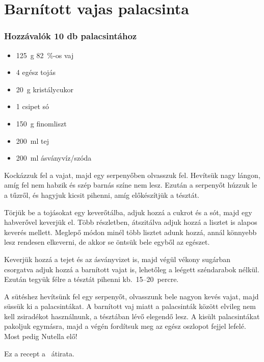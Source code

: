 \newpage
\section{Barnított vajas palacsinta} \label{sec:barnitott-vajas-palacsinta}

\subsubsection*{Hozzávalók 10 db palacsintához}
\begin{itemize}
    \item \qty{125}{\g} \qty{82}{\percent}-os vaj
    \item \num{4} egész tojás
    \item \qty{20}{\g} kristálycukor
    \item \num{1} csipet só
    \item \qty{150}{\g} finomliszt
    \item \qty{200}{\ml} tej
    \item \qty{200}{\ml} ásványvíz/szóda
\end{itemize}

Kockázzuk fel a vajat, majd egy serpenyőben olvasszuk fel. Hevítsük nagy lángon, amíg fel nem habzik és szép barnás színe nem lesz. Ezután a serpenyőt húzzuk le a tűzről, és hagyjuk kicsit pihenni, amíg előkészítjük a tésztát.

Törjük be a tojásokat egy keverőtálba, adjuk hozzá a cukrot és a sót, majd egy habverővel keverjük el. Több részletben, átszitálva adjuk hozzá a lisztet is alapos keverés mellett. Meglepő módon minél több lisztet adunk hozzá, annál könnyebb lesz rendesen elkeverni, de akkor se öntsük bele egyből az egészet.

Keverjük hozzá a tejet és az ásványvizet is, majd végül vékony sugárban csorgatva adjuk hozzá a barnított vajat is, lehetőleg a leégett széndarabok nélkül. Ezután tegyük félre a tésztát pihenni kb.~\numrange{15}{20}~percre.

A sütéshez hevítsünk fel egy serpenyőt, olvasszunk bele nagyon kevés vajat, majd süssük ki a palacsintákat. A barnított vaj miatt a palacsinták között elvileg nem kell zsiradékot használnunk, a tésztában lévő elegendő lesz. A kisült palacsintákat pakoljuk egymásra, majd a végén fordítsuk meg az egész oszlopot fejjel lefelé. Most pedig Nutella elő!

Ez a recept a~\cite{szell_palacsinta} átirata.
